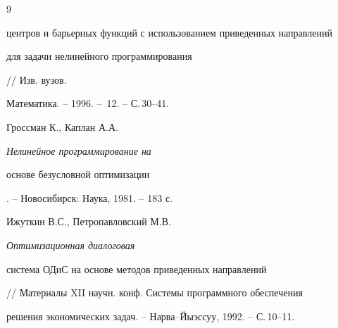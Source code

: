 \begin{thebibliography}{9}
{центров и барьерных функций с использованием приведенных направлений 


для задачи нелинейного программирования} // Изв. вузов. 


Математика. -- 1996. -- \No\,12. -- С.\,30--41. 




Гроссман К., Каплан А.А. {\em Нелинейное программирование на 


основе безусловной оптимизации}. -- Новосибирск: Наука, 1981. -- 183 с. 




Ижуткин В.С., Петропавловский М.В. {\em Оптимизационная диалоговая 


система ОДиС на основе методов приведенных направлений} 


// Материалы XII научн. конф. Системы программного обеспечения 


решения экономических задач. -- Нарва--Йыэссуу, 1992. -- С.\,10--11. 


 


\end{thebibliography} 


 


\vskip 2cm 


 






 


\label{end} 


 


